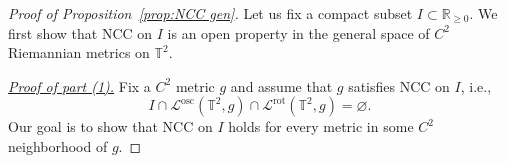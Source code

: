 \documentclass[11pt,letterpaper,oneside]{amsart}
\newcommand{\R}{\mathbb{R}}
\newcommand{\T}{\mathbb{T}}
\theoremstyle{definition}
\theoremstyle{remark}
\theoremstyle{definition}
\theoremstyle{remark}
\newcommand{\CL}{\mathcal{L}}
\DeclareMathOperator{\rot}{rot}
\DeclareMathOperator{\osc}{osc}
\begin{document}
\begin{proof}[Proof of Proposition~\ref{prop:NCC gen}]
    Let us fix a compact subset $I \subset \R_{\geq 0}$. We first show that NCC on $I$ is an open property in the general space of $C^2$ Riemannian metrics on $\T^2$.

\medskip

    \noindent \underline{\textit{Proof of part (1).}} 
    Fix a $C^2$ metric $g$ and assume that $g$ satisfies NCC on $I$, i.e.,
    \begin{equation}\label{eq:I-NCC proof starting condition}
        I \cap \CL^{\osc}(\T^2, g) \cap \CL^{\rot}(\T^2, g) = \varnothing.
    \end{equation}
    Our goal is to show that NCC on $I$ holds for every metric in some $C^2$ neighborhood of $g$.

\medskip


\end{proof}
\end{document}

